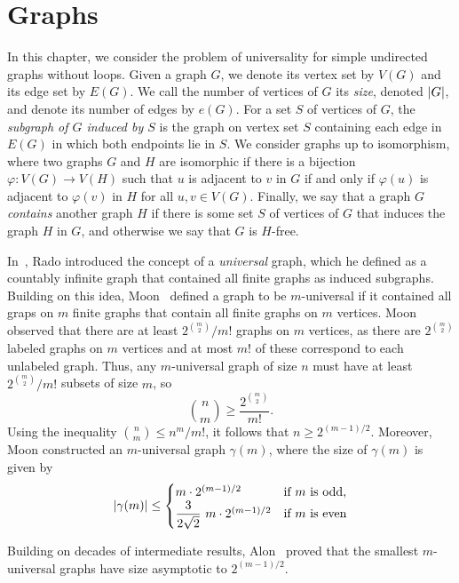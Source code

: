 \chapter{Graphs} 
\label{chap-graphs}

In this chapter, we consider the problem of universality for simple undirected graphs without loops. Given a graph $G$, we denote its vertex set by $V(G)$ and its edge set by $E(G)$. We call the number of vertices of $G$ its \emph{size}, denoted $\left\lvert{G}\right\rvert$, and denote its number of edges by $e(G)$. For a set $S$ of vertices of $G$, the \emph{subgraph of $G$ induced by $S$} is the graph on vertex set $S$ containing each edge in $E(G)$ in which both endpoints lie in $S$. We consider graphs up to isomorphism, where two graphs $G$ and $H$ are isomorphic if there is a bijection $\varphi: V(G) \to V(H)$ such that $u$ is adjacent to $v$ in $G$ if and only if $\varphi(u)$ is adjacent to $\varphi(v)$ in $H$ for all $u, v \in V(G)$. Finally, we say that a graph $G$ \emph{contains} another graph $H$ if there is some set $S$ of vertices of $G$ that induces the graph $H$ in $G$, and otherwise we say that $G$ is $H$-free.

In~\cite{rado:universal-graph:}, Rado introduced the concept of a \emph{universal} graph, which he defined as a countably infinite graph that contained all finite graphs as induced subgraphs. Building on this idea, Moon~\cite{moon:on-minimal-n-un:} defined a graph to be $m$-universal if it contained all graps on $m$ finite graphs that contain all finite graphs on $m$ vertices. Moon observed that there are at least $2^{\binom{m}{2}}/m!$ graphs on $m$ vertices, as there are $2^{\binom{m}{2}}$ labeled graphs on $m$ vertices and at most $m!$ of these correspond to each unlabeled graph. Thus, any $m$-universal graph of size $n$ must have at least $2^{\binom{m}{2}}/m!$ subsets of size $m$, so
\[
	\binom{n}{m}
	\ge
	\dfrac{2^{\binom{m}{2}}}{m!}
	.
\]
Using the inequality $\binom{n}{m} \le n^m/m!$, it follows that $n \ge 2^{(m-1)/2}$. Moreover, Moon constructed an $m$-universal graph $\gamma(m)$, where the size of $\gamma(m)$ is given by
\[
	\left\lvert{\gamma(m)}\right\rvert
	\le
	\begin{cases}
		m \cdot 2^{(m-1)/2}                       & \text{if $m$ is odd,} \\
		\dfrac{3}{2\sqrt{2}}\ m \cdot 2^{(m-1)/2} & \text{if $m$ is even}
	\end{cases}
\]

Building on decades of intermediate results, Alon~\cite{alon:asymptotically-:} proved that the smallest $m$-universal graphs have size asymptotic to $2^{(m-1)/2}$.

